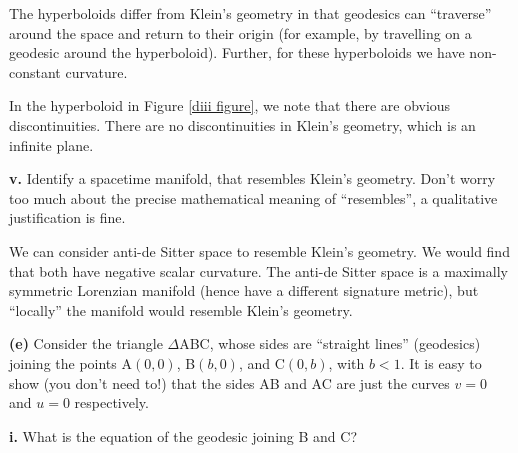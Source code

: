 \documentclass[a4paper]{article} %
\begin{document}
The hyperboloids differ from Klein's geometry in that geodesics can ``traverse'' around the space and return to their origin (for example, by travelling on a geodesic around the hyperboloid). Further, for these hyperboloids we have non-constant curvature.

In the hyperboloid in Figure \ref{diii figure}, we note that there are obvious discontinuities. There are no discontinuities in Klein's geometry, which is an infinite plane.



\begin{framed}
\textbf{v.} Identify a spacetime manifold, that resembles Klein's geometry. Don’t worry too much about the precise mathematical meaning of ``resembles'', a qualitative justification is fine.
\end{framed}

We can consider anti-de Sitter space to resemble Klein's geometry. We would find that both have negative scalar curvature. The anti-de Sitter space is a maximally symmetric Lorenzian manifold (hence have a different signature metric), but ``locally'' the manifold would resemble Klein's geometry.

\pagebreak  %

\begin{framed}
\textbf{(e)} Consider the triangle $\Delta$ABC, whose sides are ``straight lines'' (geodesics) joining the points A$(0,0)$, B$(b,0)$, and C$(0,b)$, with $b<1$. It is easy to show (you don't need to!) that the sides AB and AC are just the curves $v=0$ and $u=0$ respectively.
\end{framed}

\begin{framed}
\textbf{i.} What is the equation of the geodesic joining B and C?
\end{framed}
\end{document}
